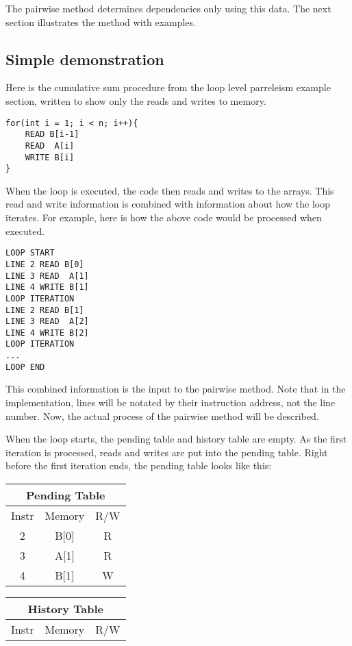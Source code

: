 \documentclass[12pt,twoside]{reedthesis}
\begin{document}
		The pairwise method determines dependencies only using this data. The next section illustrates the method with examples. 
		
		\subsection{Simple demonstration}
		
		
		Here is the cumulative sum procedure from the loop level parreleism example section, written to show only the reads and writes to memory.
				
		\begin{lstlisting}
for(int i = 1; i < n; i++){
	READ B[i-1]
	READ  A[i]
	WRITE B[i]
}
		\end{lstlisting}
		
		When the loop is executed, the code then reads and writes to the arrays. This read and write information is combined with information about how the loop iterates. For example, here is how the above code would be processed when executed. 
		
		\begin{lstlisting}
LOOP START
LINE 2 READ B[0]
LINE 3 READ  A[1]
LINE 4 WRITE B[1]
LOOP ITERATION
LINE 2 READ B[1]
LINE 3 READ  A[2]
LINE 4 WRITE B[2]
LOOP ITERATION
...
LOOP END
		\end{lstlisting}
		
		This combined information is the input to the pairwise method. Note that in the implementation, lines will be notated by their instruction address, not the line number. Now, the actual process of the pairwise method will be described. 
		
		When the loop starts, the pending table and history table are empty. As the first iteration is processed, reads and writes are put into the pending table. Right before the first iteration ends, the pending table looks like this:
		
		
		\begin{tabular}{ |c|c|c| } 
			\hline
			\multicolumn{3}{|c|}{Pending Table} \\
			\hline
			Instr & Memory & R/W \\ 
			\hline
			2 & B[0] & R \\ 
			3 & A[1] & R \\ 
			4 & B[1] & W \\ 
			\hline
		\end{tabular}
		\begin{tabular}{ |c|c|c| } 
			\hline
			\multicolumn{3}{|c|}{History Table} \\
			\hline
			Instr & Memory & R/W \\ 
			\hline
			\hline
		\end{tabular}
		
\end{document}
